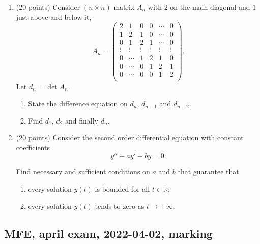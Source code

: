\begin{enumerate}
  

  \item (20 points) Consider $(n\times n)$ matrix $A_n$ with $2$ on the main diagonal and $1$ just above and below it,
    \[
    A_n = \begin{pmatrix}
      2 & 1 & 0 & 0 & \cdots & 0 \\
      1 & 2 & 1 & 0 & \cdots & 0 \\
      0 & 1 & 2 & 1 & \cdots & 0 \\
      \vdots & \vdots & \vdots & \vdots & \vdots & \vdots \\
      0 & \cdots & 1 & 2 & 1 & 0 \\
      0 & \cdots & 0 & 1 & 2 & 1 \\
      0 & \cdots & 0 & 0 & 1 & 2 \\
    \end{pmatrix}.
    \]
  Let $d_n = \det A_n$. 
  \begin{enumerate}
    \item State the difference equation on $d_n$, $d_{n-1}$ and $d_{n-2}$. 
    \item Find $d_1$, $d_2$ and finally $d_n$. 
  \end{enumerate}
  
    
  \item (20 points) Consider the second order differential equation with constant coefficients
  \[
  y''+ay' + by = 0.  
  \]    
  
  Find necessary and sufficient conditions on $a$ and $b$ that guarantee that
  
  \begin{enumerate}
    \item every solution $y(t)$ is bounded for all $t\in \mathbb{R}$;
    \item every solution $y(t)$ tends to zero as $t \to +\infty$.
  \end{enumerate}
  
  \end{enumerate}
  
  

\subsection{MFE, april exam, 2022-04-02, marking}


